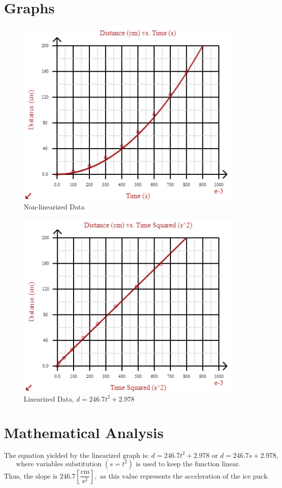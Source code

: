 \documentclass{article}
\begin{document}
\section{Graphs}

\begin{figure}[htpb]
  \centering
  \includegraphics[width=.7\textwidth]{Figures/Curved.png}
  \caption{Non-linearized Data}
\end{figure}

\begin{figure}[htpb]
  \centering
  \includegraphics[width=.7\textwidth]{Figures/Linear.png}
  \caption{Linearized Data, $d=246.7t^2+2.978$}
\end{figure}

\newpage

\section{Mathematical Analysis}

$$\text{The equation yielded by the linearized graph is: } d=246.7t^2+2.978 \text{ or } d=246.7s+2.978, $$
$$\text{where variables substitution } (s = t^2) \text{ is used to keep the function linear.}$$
$$\text{Thus, the slope is } 246.7\left[\frac{\si{\centi\meter}}{\si{\second\squared}}\right], \text{ as this value represents the acceleration of the ice puck.}$$
\end{document}
